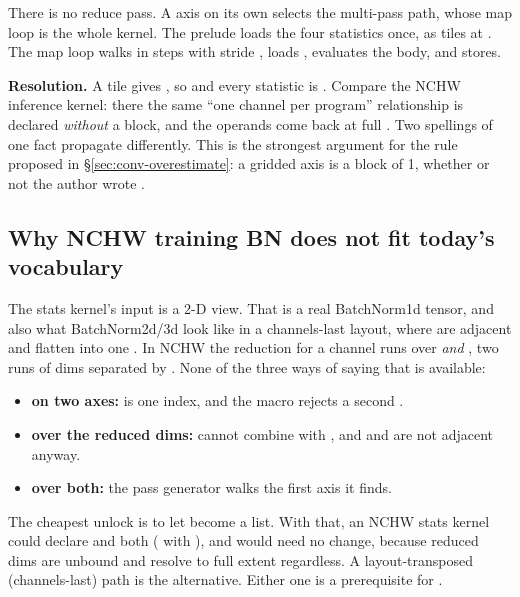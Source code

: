 There is no reduce pass. A  axis on its own selects the multi-pass path,
whose map loop is the whole kernel. The prelude loads the four statistics once, as
\code{[1]} tiles at . The map loop walks  in 
steps with stride , loads , evaluates the body, and stores.

\textbf{Resolution.} A  tile \code{[?, k]} gives , so
 and every statistic is \code{[k]}. Compare the NCHW inference
kernel: there the same ``one channel per program'' relationship is declared
\emph{without} a block, and the operands come back at full . Two spellings
of one fact propagate differently. This is the strongest argument for the rule
proposed in \S\ref{sec:conv-overestimate}: a gridded axis is a block of 1, whether
or not the author wrote .

\subsection{Why NCHW training BN does not fit today's vocabulary}
\label{sec:bn-train}

The stats kernel's input is a 2-D \code{[N, C]} view. That is a real BatchNorm1d
tensor, and also what BatchNorm2d/3d look like in a channels-last layout, where
 are adjacent and flatten into one . In NCHW the reduction for
a channel runs over  \emph{and} , two runs of dims separated by
. None of the three ways of saying that is available:

\begin{itemize}
\item \textbf{ on two axes:}  is one index, and the
  macro rejects a second .
\item \textbf{ over the reduced dims:}  cannot combine with
  , and  and  are not adjacent anyway.
\item \textbf{ over both:} the pass generator walks the first 
  axis it finds.
\end{itemize}

The cheapest unlock is to let  become a list. With that, an NCHW
stats kernel could declare  and  both  ( with
), and  would need no change, because reduced dims
are unbound and resolve to full extent regardless. A layout-transposed
(channels-last) path is the alternative. Either one is a prerequisite for
.
